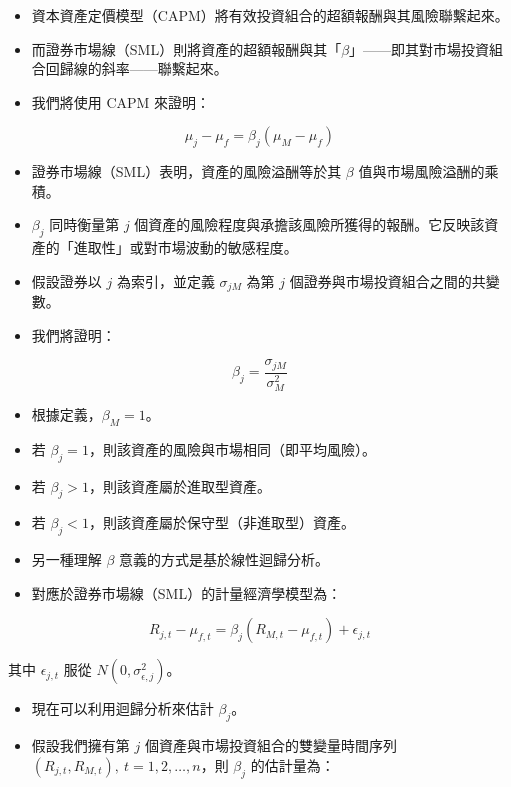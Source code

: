 \documentclass[letterpaper]{article}
\begin{document}
\begin{itemize}
	\item 資本資產定價模型（CAPM）將有效投資組合的超額報酬與其風險聯繫起來。
	\item 而證券市場線（SML）則將資產的超額報酬與其「$\beta$」——即其對市場投資組合回歸線的斜率——聯繫起來。
	\item 我們將使用 CAPM 來證明：
\end{itemize}


$$
\mu_{j}-\mu_{f}=\beta_{j}\left(\mu_{M}-\mu_{f}\right)
$$

\begin{itemize}
	\item 證券市場線（SML）表明，資產的風險溢酬等於其 $\beta$ 值與市場風險溢酬的乘積。
	\item $\beta_{j}$ 同時衡量第 $j$ 個資產的風險程度與承擔該風險所獲得的報酬。它反映該資產的「進取性」或對市場波動的敏感程度。
	\item 假設證券以 $j$ 為索引，並定義 $\sigma_{j M}$ 為第 $j$ 個證券與市場投資組合之間的共變數。
	\item 我們將證明：
\end{itemize}


$$
\beta_{j}=\frac{\sigma_{j M}}{\sigma_{M}^{2}}
$$

\begin{itemize}
	\item 根據定義，$\beta_{M}=1$。
	\item 若 $\beta_{j}=1$，則該資產的風險與市場相同（即平均風險）。
	\item 若 $\beta_{j}>1$，則該資產屬於進取型資產。
	\item 若 $\beta_{j}<1$，則該資產屬於保守型（非進取型）資產。
	\item 另一種理解 $\beta$ 意義的方式是基於線性迴歸分析。
	\item 對應於證券市場線（SML）的計量經濟學模型為：
\end{itemize}


$$
R_{j, t}-\mu_{f, t}=\beta_{j}\left(R_{M, t}-\mu_{f, t}\right)+\epsilon_{j, t}
$$

其中 $\epsilon_{j, t}$ 服從 $N\left(0, \sigma_{\epsilon, j}^{2}\right)$。

\begin{itemize}
	\item 現在可以利用迴歸分析來估計 $\beta_{j}$。
	\item 假設我們擁有第 $j$ 個資產與市場投資組合的雙變量時間序列 $\left(R_{j, t}, R_{M, t}\right),\ t=1,2,\ldots,n$，則 $\beta_{j}$ 的估計量為：
\end{itemize}
\end{document}
